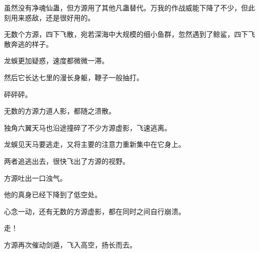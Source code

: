 \begin{this_body}
虽然没有净魂仙蛊，但方源用了其他凡蛊替代。万我的作战威能下降了不少，但此刻用来惑敌，还是很好用的。

无数个方源，四下飞散，宛若深海中大规模的细小鱼群，忽然遇到了鲸鲨，四下飞散奔逃的样子。

龙蜈更加疑惑，速度都微微一滞。

然后它长达七里的漫长身躯，鞭子一般抽打。

砰砰砰。

无数的方源力道人影，都随之溃散。

独角六翼天马也沿途撞碎了不少方源虚影，飞速逃离。

龙蜈见天马要逃走，又将主要的注意力重新集中在它身上。

两者追逃出去，很快飞出了方源的视野。

方源吐出一口浊气。

他的真身已经下降到了低空处。

心念一动，还有无数的方源虚影，都在同时之间自行崩溃。

走！

方源再次催动剑遁，飞入高空，扬长而去。

\end{this_body}


